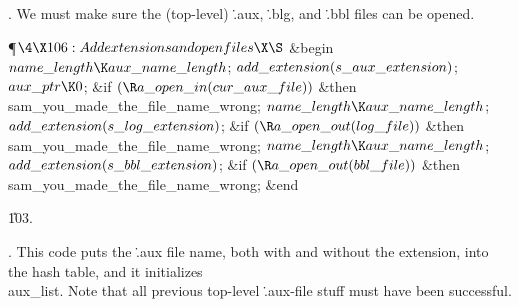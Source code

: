 .
We must make sure the (top-level) \.{.aux}, \.{.blg}, and \.{.bbl}
files can be opened.

\Y\P$\4\X106:Add extensions and open files\X\S$\6
\&{begin} $\\{name\_length}\K\\{aux\_name\_length}$;\6
$\\{add\_extension}(\\{s\_aux\_extension})$;%
\6
$\\{aux\_ptr}\K0$;\6
\&{if} $(\R\\{a\_open\_in}(\\{cur\_aux\_file}))$ \1\&{then}\5
\\{sam\_you\_made\_the\_file\_name\_wrong};\2\6
$\\{name\_length}\K\\{aux\_name\_length}$;\5
$\\{add\_extension}(\\{s\_log\_extension})$;%
\6
\&{if} $(\R\\{a\_open\_out}(\\{log\_file}))$ \1\&{then}\5
\\{sam\_you\_made\_the\_file\_name\_wrong};\2\6
$\\{name\_length}\K\\{aux\_name\_length}$;\5
$\\{add\_extension}(\\{s\_bbl\_extension})$;%
\6
\&{if} $(\R\\{a\_open\_out}(\\{bbl\_file}))$ \1\&{then}\5
\\{sam\_you\_made\_the\_file\_name\_wrong};\2\6
\&{end}\par
\U103.\fi

.
This code puts the \.{.aux} file name, both with and without the
extension, into the hash table, and it initializes \\{aux\_list}.  Note
that all previous top-level \.{.aux}-file stuff must have been
successful.

